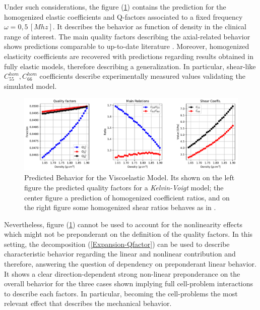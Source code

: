Under such considerations, the figure (\ref{BernardPredictionHomCoeffs}) contains the prediction for the homogenized elastic coefficients and Q-factors associated to a fixed frequency $\omega = 0,5 \, [Mhz]$. It describes the behavior as function of density in the clinical range of interest. The main quality factors describing the axial-related behavior shows predictions comparable to up-to-date literature \cite{Bernard2015}. Moreover, homogenized elasticity coefficients are recovered with predictions regarding results obtained in fully elastic models, therefore describing a generalization. 
In particular, shear-like $C_{55}^{hom}, C_{66}^{hom}$ coefficients describe experimentally measured values validating the simulated model.

\begin{figure}[!h]
	\centering
	\includegraphics[width=\textwidth]{images/Qfactors/CellProb_QfactorCircular5E-2_Relations.pdf}
	\caption{Predicted Behavior for the Viscoelastic Model. Its shown on the left figure the predicted quality factors for a \textit{Kelvin-Voigt} model; the center figure a prediction of homogenized coefficient ratios, and on the right figure some homogenized shear ratios behaves as in \cite{Bernard2015}.}
	\label{BernardPredictionHomCoeffs}
\end{figure} 

Nevertheless, figure (\ref{BernardPredictionHomCoeffs}) cannot be used to account for the nonlinearity effects which might not be preponderant on the definition of the quality factors. In this setting, the decomposition (\ref{Expansion-Qfactor}) can be used to describe characteristic behavior regarding the linear and nonlinear contribution and therefore, answering the question of dependency on preponderant linear behavior. It shows a clear
direction-dependent strong non-linear preponderance on the overall behavior for the three cases shown implying full cell-problem interactions to describe each factors. In particular, becoming the cell-problems the most relevant effect that describes the mechanical behavior.

